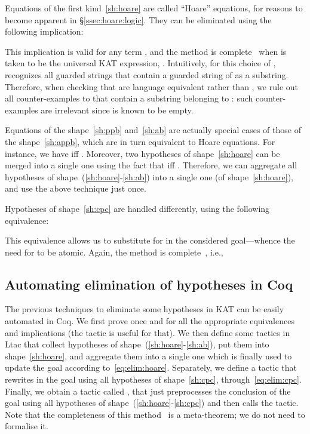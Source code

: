 \documentclass[a4paper]{llncs}
\begin{document}
Equations of the first kind~\eqref{sh:hoare} are called ``Hoare''
equations, for reasons to become apparent in
§\ref{ssec:hoare:logic}. They can be eliminated using the following
implication:

This implication is valid for any term , and the method is
complete~\cite{hardink02:kat:hypotheses} when  is taken to be the
universal KAT expression, .
Intuitively, for this choice of ,  recognizes all guarded
strings that contain a guarded string of  as a
substring. Therefore, when checking that  are language
equivalent rather than , we rule out all counter-examples to
 that contain a substring belonging to : such counter-examples
are irrelevant since  is known to be empty.

\medskip

Equations of the shape~\eqref{sh:ppb} and~\eqref{sh:ab} are actually
special cases of those of the shape~\eqref{sh:appb}, which are in turn
equivalent to Hoare equations. For instance, we have 
iff .
Moreover, two hypotheses of shape~\eqref{sh:hoare} can be merged into
a single one using the fact that  iff
. Therefore, we can aggregate all hypotheses of
shape~(\ref{sh:hoare}-\ref{sh:ab}) into a single one (of
shape~\eqref{sh:hoare}), and use the above technique just once.

\medskip

\noindent
Hypotheses of shape~\eqref{sh:cpc} are handled differently, using the following
equivalence:

This equivalence allows us to substitute  for  in
the considered goal---whence the need for  to be atomic. Again, the
method is complete~\cite{hardink02:kat:hypotheses}, i.e.,


\subsection{Automating elimination of hypotheses in Coq}
\label{ssec:hkat}

The previous techniques to eliminate some hypotheses in KAT can be
easily automated in Coq. We first prove once and for all the
appropriate equivalences and implications (the tactic  is
useful for that). We then define some tactics in Ltac that collect
hypotheses of shape~(\ref{sh:hoare}-\ref{sh:ab}), put them into
shape~\eqref{sh:hoare}, and aggregate them into a single one which is
finally used to update the goal according
to~\eqref{eq:elim:hoare}. Separately, we define a tactic that rewrites
in the goal using all hypotheses of shape~\eqref{sh:cpc},
through~\eqref{eq:elim:cpc}. Finally, we obtain a tactic called
, that just preprocesses the conclusion of the goal using
all hypotheses of shape~(\ref{sh:hoare}-\ref{sh:cpc}) and then calls
the  tactic.
Note that the completeness of this
method~\cite{hardink02:kat:hypotheses} is a meta-theorem; we do not
need to formalise it.
\end{document}
